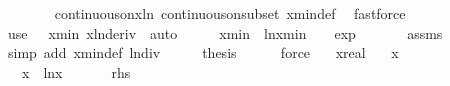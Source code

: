 \begin{isabellebody}
\ \ \ \ \ \ \isamarkupfalse%
\ continuous{\isacharunderscore}{\kern0pt}on{\isacharunderscore}{\kern0pt}x{\isacharunderscore}{\kern0pt}ln\ continuous{\isacharunderscore}{\kern0pt}on{\isacharunderscore}{\kern0pt}subset\ xmin{\isacharunderscore}{\kern0pt}def\ \isamarkupfalse%
\ fastforce\isanewline
\ \ \isamarkupfalse%
\ {\isacharparenleft}{\kern0pt}use\ {\isacartoucheopen}{}\ {\isacharless}{\kern0pt}\ xmin{\isacartoucheclose}\ xln{\isacharunderscore}{\kern0pt}deriv\ \ auto{\isacharparenright}{\kern0pt}\isanewline
\ \ \isamarkupfalse%
\ \isamarkupfalse%
\ {\isachardoublequoteopen}xmin\ {\isacharasterisk}{\kern0pt}\ ln{\isacharparenleft}{\kern0pt}xmin{\isacharparenright}{\kern0pt}\ {\isacharequal}{\kern0pt}\ {\isacharminus}{\kern0pt}{}\ {\isacharslash}{\kern0pt}\ exp\ {}{\isachardoublequoteclose}\isanewline
\ \ \ \ \isamarkupfalse%
\ assms\ \isamarkupfalse%
\ {\isacharparenleft}{\kern0pt}simp\ add{\isacharcolon}{\kern0pt}\ xmin{\isacharunderscore}{\kern0pt}def\ ln{\isacharunderscore}{\kern0pt}div{\isacharparenright}{\kern0pt}\isanewline
\ \ \isamarkupfalse%
\ \isamarkupfalse%
\ {\isacharquery}{\kern0pt}thesis\isanewline
\ \ \ \ \isamarkupfalse%
\ force\isanewline
{}\isamarkupfalse%
%
\endisatagproof
{\isafoldproof}%
%
\isadelimproof
\isanewline
%
\endisadelimproof
\isanewline
\isanewline
{}\isamarkupfalse%
\isanewline
\ \ \ x{\isacharcolon}{\kern0pt}{\isacharcolon}{\kern0pt}real\isanewline
\ \ \ {\isachardoublequoteopen}x\ {\isasymge}\ {}{\isachardoublequoteclose}\isanewline
\ \ \ {\isachardoublequoteopen}x\ {\isacharasterisk}{\kern0pt}\ ln{\isacharparenleft}{\kern0pt}x{\isacharparenright}{\kern0pt}\ {\isasymge}\ {\isacharminus}{\kern0pt}{}{\isachardot}{\kern0pt}{}{}{}{}{}{}{}{}{}{}{}{}{}{}{}{}{}{\isachardoublequoteclose}\ \ {\isacharparenleft}{\kern0pt}\ {\isachardoublequoteopen}{\isacharunderscore}{\kern0pt}\ {\isasymge}\ {\isacharquery}{\kern0pt}rhs{\isachardoublequoteclose}{\isacharparenright}{\kern0pt}\isanewline
%
\isadelimproof
%
\endisadelimproof
%
\isatagproof

\end{isabellebody}
